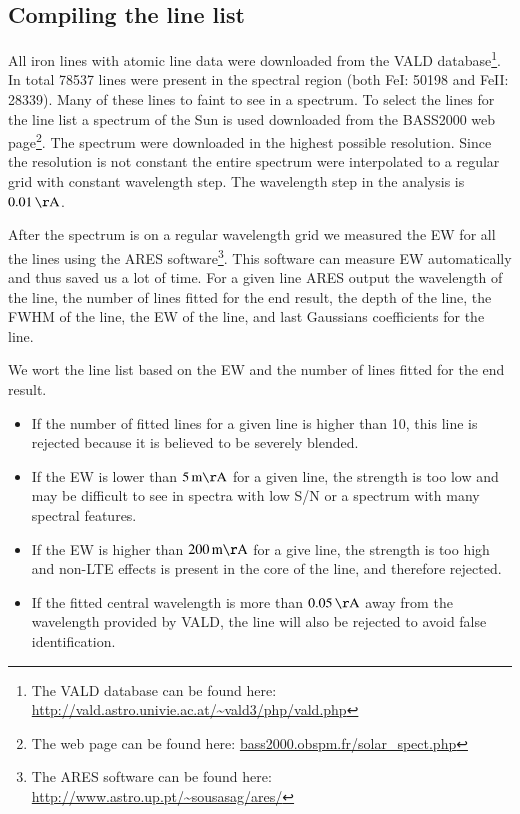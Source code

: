 \documentclass{aa}
\begin{document}
\subsection{Compiling the line list}
All iron lines with atomic line data were downloaded from the VALD
database\footnote{The VALD database can be found here:
\url{http://vald.astro.univie.ac.at/~vald3/php/vald.php}}. In total 78537 lines
were present in the spectral region (both FeI: 50198 and FeII: 28339). Many of
these lines to faint to see in a spectrum. To select the lines for the line
list a spectrum of the Sun is used downloaded from the BASS2000 web
page\footnote{The web page can be found here:
\url{bass2000.obspm.fr/solar_spect.php}}. The spectrum were downloaded in the
highest possible resolution. Since the resolution is not constant the entire
spectrum were interpolated to a regular grid with constant wavelength step. The
wavelength step in the analysis is $\SI{0.01}{\AA}$.

After the spectrum is on a regular wavelength grid we measured the EW for all
the lines using the ARES software\footnote{The ARES software can be found here:
\url{http://www.astro.up.pt/~sousasag/ares/}}\citep{Sousa2007}. This software
can measure EW automatically and thus saved us a lot of time. For a given line
ARES output the wavelength of the line, the number of lines fitted for the end
result, the depth of the line, the FWHM of the line, the EW of the line, and
last Gaussians coefficients for the line.

We wort the line list based on the EW and the number of lines fitted for the
end result.
\begin{itemize}
    \item If the number of fitted lines for a given line is higher than 10,
        this line is rejected because it is believed to be severely blended.
    \item If the EW is lower than $\SI{5}{m\AA}$ for a given line, the strength
        is too low and may be difficult to see in spectra with low S/N or a
        spectrum with many spectral features.
    \item If the EW is higher than $\SI{200}{m\AA}$ for a give line, the strength
        is too high and non-LTE effects is present in the core of the line, and
        therefore rejected.
    \item If the fitted central wavelength is more than $\SI{0.05}{\AA}$ away
        from the wavelength provided by VALD, the line will also be rejected to
        avoid false identification.
\end{itemize}
\end{document}
